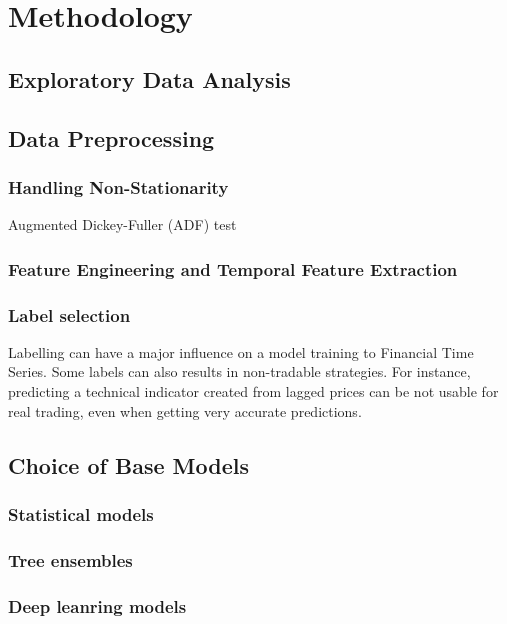 \chapter{Methodology}

\section{Exploratory Data Analysis} 


\section{Data Preprocessing}
\cite{Daniel2019}


\subsection{Handling Non-Stationarity} %

Augmented Dickey-Fuller (ADF) test





\subsection{Feature Engineering and Temporal Feature Extraction} %
\subsection{Label selection}
Labelling can have a major influence on a model training
to Financial Time Series. Some labels can also results in
non-tradable strategies. For instance, predicting a technical indicator created from lagged prices can be not usable for real trading, even when getting very accurate predictions.


\section{Choice of Base Models}
\subsection{Statistical models}
\subsection{Tree ensembles}
\subsection{Deep leanring models}


